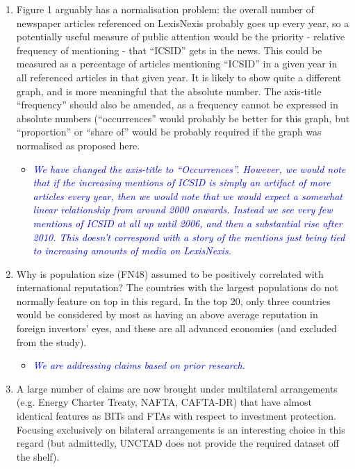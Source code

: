 \begin{enumerate}
\begin{itemize}
	\end{itemize}
	\item Figure 1 arguably has a normalisation problem: the overall number of newspaper articles referenced on LexisNexis probably goes up every year, so a potentially useful measure of public attention would be the priority - relative frequency of mentioning - that ``ICSID'' gets in the news. This could be measured as a percentage of articles mentioning ``ICSID'' in a given year in all referenced articles in that given year. It is likely to show quite a different graph, and is more meaningful that the absolute number. The axis-title ``frequency'' should also be amended, as a frequency cannot be expressed in absolute numbers (``occurrences'' would probably be better for this graph, but ``proportion'' or ``share of'' would be probably required if the graph was normalised as proposed here. 	
	\begin{itemize}
		\item \textcolor{blue}{ \emph{ 
		We have changed the axis-title to ``Occurrences''. However, we would note that if the increasing mentions of ICSID is simply an artifact of more articles every year, then we would note that we would expect a somewhat linear relationship from around 2000 onwards. Instead we see very few mentions of ICSID at all up until 2006, and then a substantial rise after 2010. This doesn't correspond with a story of the mentions just being tied to increasing amounts of media on LexisNexis.
		}}
	\end{itemize}
	\item Why is population size (FN48) assumed to be positively correlated with international reputation? The countries with the largest populations do not normally feature on top in this regard. In the top 20, only three countries would be considered by most as having an above average reputation in foreign investors' eyes, and these are all advanced economies (and excluded from the study). 
	\begin{itemize}
		\item \textcolor{blue}{ \emph{
		We are addressing claims based on prior research.
		}}
	\end{itemize}
	\item A large number of claims are now brought under multilateral arrangements (e.g. Energy Charter Treaty, NAFTA, CAFTA-DR) that have almost identical features as BITs and FTAs with respect to investment protection. Focusing exclusively on bilateral arrangements is an interesting choice in this regard (but admittedly, UNCTAD does not provide the required dataset off the shelf). 		

\end{enumerate}
